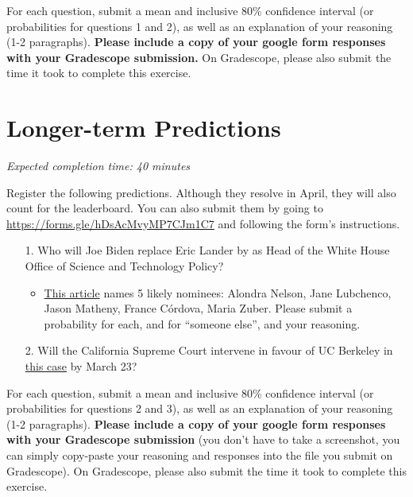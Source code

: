 \documentclass[11pt]{article}
\begin{document}
For each question, submit a mean and inclusive 80\% confidence interval (or probabilities for questions 1 and 2), as well as an explanation of your reasoning (1-2 paragraphs). \textbf{Please include a copy of your google form responses with your Gradescope submission.} On Gradescope, please also submit the time it took to complete this exercise.

\section*{Longer-term Predictions}

\emph{Expected completion time: 40 minutes}

Register the following predictions. Although they resolve in April, they will also count for the leaderboard. You can also submit them by going to \url{https://forms.gle/hDsAcMvyMP7CJm1C7} and following the form's instructions.


\begin{enumerate}
	\item[1.] Who will Joe Biden replace Eric Lander by as Head of the White House Office of Science and Technology Policy?
	\begin{itemize}
		\item \href{https://www.politico.com/newsletters/morning-tech/2022/02/09/the-race-to-replace-lander-at-ostp-00007114}{This article} names 5 likely nominees: Alondra Nelson, Jane Lubchenco, Jason Matheny, France Córdova, Maria Zuber. Please submit a probability for each, and for ``someone else'', and your reasoning.
	\end{itemize} 
	\item[2.] Will the California Supreme Court intervene in favour of UC Berkeley in \href{https://www.berkeleyside.org/2022/02/14/uc-berkeley-enrollment-drop-court-of-appeal-ruling}{this case} by March 23?
\end{enumerate}

For each question, submit a mean and inclusive 80\% confidence interval (or probabilities for questions 2 and 3), as well as an explanation of your reasoning (1-2 paragraphs). \textbf{Please include a copy of your google form responses with your Gradescope submission} (you don't have to take a screenshot, you can simply copy-paste your reasoning and responses into the file you submit on Gradescope). On Gradescope, please also submit the time it took to complete this exercise.

\end{document}
